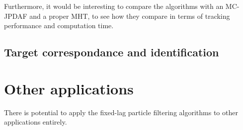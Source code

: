 Furthermore, it would be interesting to compare the algorithms with an MC-JPDAF and a proper MHT, to see how they compare in terms of tracking performance and computation time.



\subsection{Target correspondance and identification}





\section{Other applications}
There is potential to apply the fixed-lag particle filtering algorithms to other applications entirely. 